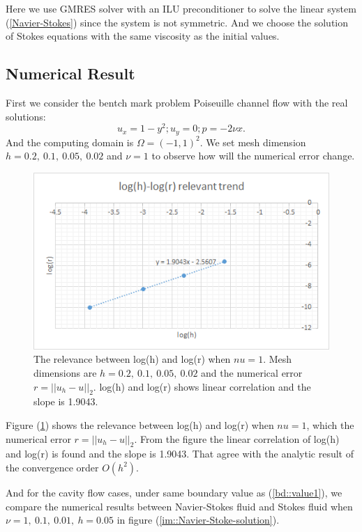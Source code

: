 \documentclass[a4paper]{article}
\begin{document}
Here we use GMRES solver with an ILU preconditioner to solve the
linear system (\ref{Navier-Stokes}) since the system is not
symmetric. And we choose the solution of Stokes equations with the
same viscosity as the initial values.

\subsection{Numerical Result}
First we consider the bentch mark problem Poiseuille channel flow with the real solutions:
\begin{equation}
u_x = 1-y^2;  u_y = 0; p=-2\nu x.
\label{pr::accurate}
\end{equation}
And the computing domain is $\Omega = (-1,1)^2$. We set mesh dimension
$h=0.2,\ 0.1,\ 0.05,\ 0.02$ and $\nu=1$ to observe how will the
numerical error change.

\begin{figure}[h]
\centering
\includegraphics[scale = 0.8]{images/convergence.png}
\caption{The relevance between log(h) and log(r) when $nu=1$.  Mesh
  dimensions are $h=0.2,\ 0.1, \ 0.05, \ 0.02$ and the numerical error
  $r=||u_h-u||_2$. log(h) and log(r) shows linear correlation and the
  slope is 1.9043.}
\label{im::log(h)-res}
\end{figure}

Figure (\ref{im::log(h)-res}) shows the relevance between log(h) and
log(r) when $nu=1$, which the numerical error $r=||u_h-u||_2$. From
the figure the linear correlation of log(h) and log(r) is found and
the slope is 1.9043. That agree with the analytic result of the
convergence order $O(h^2)$.

And for the cavity flow cases, under same boundary value as
(\ref{bd::value1}), we compare the numerical results between
Navier-Stokes fluid and Stokes fluid when
$\nu=1,\ 0.1,\ 0.01,\ h=0.05$ in figure
(\ref{im::Navier-Stoke-solution}).
\end{document}
